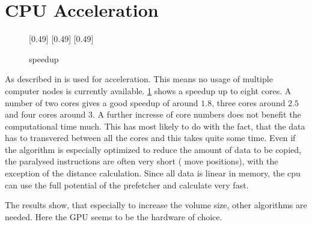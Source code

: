 \section{CPU Acceleration}
% 
\begin{figure}[!t]
\centering
% 
[0.49\textwidth]{
}
% 
[0.49\textwidth]{
}
% 
[0.49\textwidth]{
}
\caption{speedup}
\label{fig:solverSpeedup}
\end{figure}
% 
% 
As described in \dummy{} \openmp{} is used for acceleration.
This means no usage of multiple computer nodes is currently available.
\cref{fig:solverSpeedup} shows a speedup up to eight cores.
A number of two cores gives a good speedup of around $1.8$, three cores around $2.5$ and four cores around $3$.
A further incresse of core numbers does not benefit the computational time much.
This has most likely to do with the fact, that the data has to transvered between all the cores and this takes quite some time.
Even if the algorithm is especially optimized to reduce the amount of data to be copied, the paralysed instructions are often very short (\eg{} move positions), with the exception of the distance calculation.
Since all data is linear in memory, the cpu can use the full potential of the prefetcher and calculate very fast.
\par
% 
The results show, that especially to increase the volume size, other algorithms are needed. 
Here the \ac{GPU} seems to be the hardware of choice.
% 
% 
% 
